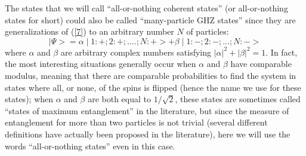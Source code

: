 \documentclass[12pt,onecolumn]{article}%
\begin{document}
\label{complete-ent}

The states that we will call ``all-or-nothing coherent states'' (or
all-or-nothing states for short) could also be called ``many-particle GHZ
states'' since they are generalizations of (\ref{7}) to an arbitrary number
$N$ of particles:%
\begin{equation}
\mid\Psi>=\alpha\mid1:+;2:+;....;N:+>+\beta\mid1:-;2:-;...;N:-> \label{20}%
\end{equation}
where $\alpha$ and $\beta$ are arbitrary complex numbers satisfying $\left|
\alpha\right|  ^{2}+\left|  \beta\right|  ^{2}=1$. In fact, the most
interesting situations generally occur when $\alpha$ and $\beta$ have
comparable modulus, meaning that there are comparable probabilities to find
the system in states where all, or none, of the spins is flipped (hence the
name we use for these states); when $\alpha$ and $\beta$ are both equal to
$1/\sqrt{2}$, these states are sometimes called ``states of maximum
entanglement'' in the literature, but since the measure of entanglement for
more than two particles is not trivial (several different definitions have
actually been proposed in the literature), here we will use the words
``all-or-nothing states'' even in this case.
\end{document}
